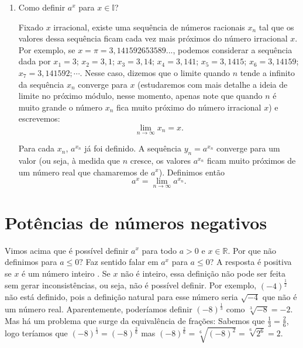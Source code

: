 \begin{enumerate}
	\begin{exe}

	\begin{enumerate}
		\item \color{red} $3^{\frac{5}{2}}=\sqrt{3^5}=\sqrt{3^4\cdot 3}=9\sqrt{3}$.
		\item $\left(\frac{2}{3}\right)^{-\frac{2}{3}}=\left(\frac{3}{2}\right)^{\frac{2}{3}}=\sqrt[3]{\frac{9}{4}}$. \color{black}
	\end{enumerate}
	\end{exe}

	\item Como definir $a^x$ para $x\in\mathbb{I}$?

	Fixado $x$ irracional, existe uma sequência de números racionais $x_n$ tal que os valores dessa sequência ficam cada vez mais próximos do número irracional $x$. Por exemplo, se $x=\pi=3,141592653589...$, podemos considerar a sequência dada por $x_1=3$; $x_2=3,1$; $x_3=3,14$; $x_4=3,141$; $x_5=3,1415$; $x_6=3,14159$; $x_7=3,141592;\cdots$. Nesse caso, dizemos que o limite quando $n$ tende a infinito da sequência $x_n$ converge para $x$ (estudaremos com mais detalhe a ideia de limite no próximo módulo, nesse momento, apenas note que quando $n$ é muito grande o número $x_n$ fica muito próximo do número irracional $x$) e escrevemos:
	\[\lim_{n\rightarrow\infty}x_n=x. \]

	Para cada $x_n$, $a^{x_n}$ já foi definido. A sequência $y_n=a^{x_n}$ converge para um valor (ou seja, à medida que $n$ cresce, os valores $a^{x_n}$ ficam muito próximos de um número real que chamaremos de $a^x$). Definimos então
	\[a^{x}=\lim_{n\rightarrow\infty}a^{x_n}. \]
\end{enumerate}

\section{Potências de números negativos}

Vimos acima que é possível definir $a^x$ para todo $a>0$ e $x\in\mathbb{R}$. Por que não definimos para $a\leq 0?$ Faz sentido falar em $a^x$ para $a\leq 0$?
A resposta é positiva se $x$ é um número inteiro . Se $x$  não é inteiro,
 essa definição não pode ser feita sem gerar inconsistências, ou seja, não é possível definir. Por exemplo, $(-4)^{\frac{1}{2}}$ não está definido, pois a definição natural para esse número seria $\sqrt{-4}$ que não é um número real. Aparentemente, poderíamos definir $(-8)^{\frac{1}{3}}$ como $\sqrt[3]{-8}=-2$. Mas há um problema que surge da equivalência de frações: Sabemos que $\frac{1}{3}=\frac{2}{6}$, logo teríamos que $(-8)^{\frac{1}{3}}=(-8)^{\frac{2}{6}}$ mas $(-8)^{\frac{2}{6}}=\sqrt[6]{(-8)^2}=\sqrt[6]{2^6}=2$.

